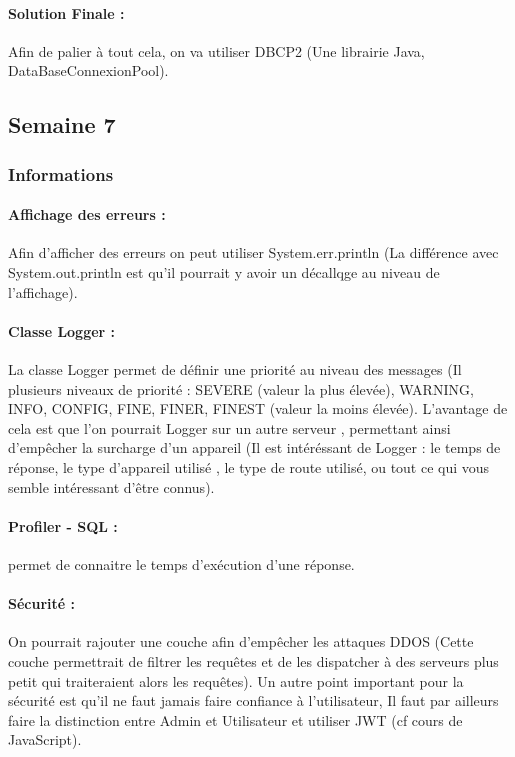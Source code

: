 \documentclass{article}[12pt]
\begin{document}
\paragraph{Solution Finale : } Afin de palier à tout cela, on va utiliser DBCP2 (Une librairie Java, DataBaseConnexionPool).
\subsection{Semaine 7}
\subsubsection{Informations}
\paragraph{Affichage des erreurs : } Afin d'afficher des erreurs on peut utiliser System.err.println (La différence avec System.out.println est qu'il pourrait y avoir un décallqge au niveau de l'affichage).
\paragraph{Classe Logger : } La classe Logger permet de définir une priorité au niveau des messages (Il plusieurs niveaux de priorité : SEVERE (valeur la plus élevée), WARNING, INFO, CONFIG, FINE, FINER, FINEST (valeur la moins élevée). L'avantage de cela est que l'on pourrait Logger sur un autre serveur , permettant ainsi d'empêcher la surcharge d'un appareil (Il est intéréssant de Logger : le temps de réponse, le type d'appareil utilisé , le type de route utilisé, ou tout ce qui vous semble intéressant d'être connus). 
\paragraph{Profiler - SQL : } permet de connaitre le temps d'exécution d'une réponse.
\paragraph{Sécurité : } On pourrait rajouter une couche afin d'empêcher les attaques DDOS (Cette couche permettrait de filtrer les requêtes et de les dispatcher à des serveurs plus petit qui traiteraient alors les requêtes).  Un autre point important pour la sécurité est qu'il ne faut jamais faire confiance à l'utilisateur, Il faut par ailleurs faire la distinction entre Admin et Utilisateur et utiliser JWT (cf cours de JavaScript).
\end{document}
